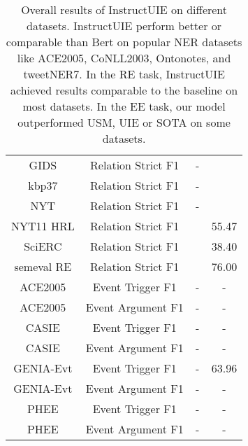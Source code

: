 \begin{table*}[htbp]
{\begin{tabular}{c|c|cc}
    GIDS & Relation Strict F1 & - \\
    kbp37 & Relation Strict F1 & - \\
    NYT & Relation Strict F1 & - \\
    NYT11 HRL & Relation Strict F1 & \citet{NYT11HRLSOTA} & 55.47 \\
    SciERC & Relation Strict F1 & \citet{SciERCSOTA} & 38.40 \\ 
    semeval RE & Relation Strict F1 & \
    \citet{semevalRESOTA} & 76.00 \\
    ACE2005 & Event Trigger F1 & - & -  \\
    ACE2005 & Event Argument F1 & - & - \\
    CASIE & Event Trigger F1 & - & - \\
    CASIE & Event Argument F1 & - & - \\
    GENIA-Evt & Event Trigger F1 & - & 63.96 \\
    GENIA-Evt & Event Argument F1 & - & - \\
    PHEE & Event Trigger F1 & - & - \\
    PHEE & Event Argument F1 & - & - \\
    \bottomrule
    \end{tabular}
}
    \caption{
Overall results of InstructUIE on different datasets. InstructUIE perform better or comparable than Bert on popular NER datasets like ACE2005, CoNLL2003, Ontonotes, and tweetNER7. In the RE task, InstructUIE achieved results comparable to the baseline on most datasets. In the EE task, our model outperformed USM, UIE or SOTA on some datasets.
}
\label{supervised-result-withSOTA}
\end{table*}

